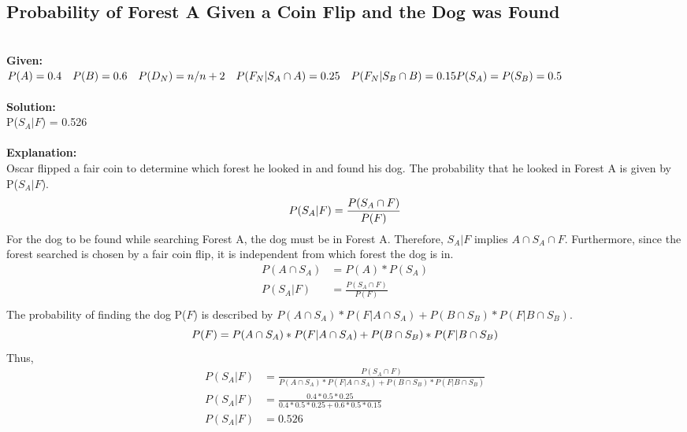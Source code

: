 \subsection{Probability of Forest A Given a Coin Flip and the Dog was Found}
 \\
{\bf Given:}\\    
    $ P(A) = 0.4 \quad P(B) = 0.6 \quad P(D_N) = n/n+2 \quad P(F_{N}|S_A \cap A) = 0.25 \quad P(F_{N}|S_B \cap B) = 0.15 \\ P(S_A)=P(S_B)=0.5$\\ \\
{\bf Solution:}\\
    {\color{blue}P($S_A|F$) = 0.526}\\ \\
{\bf Explanation:}\\
    Oscar flipped a fair coin to determine which forest he looked in and found his dog. The probability that he looked in Forest A is given by P($S_A|F$). \\
    \begin{equation*}
        P(S_A|F) = \frac{P(S_A \cap F)}{P(F)}  \\
    \end{equation*}
    For the dog to be found while searching Forest A, the dog must be in Forest A. Therefore, $S_A|F$ implies $A \cap S_A \cap F$. Furthermore, since the forest searched is chosen by a fair coin flip, it is independent from which forest the dog is in. 
    \begin{align*}
        P(A \cap S_A) &= P(A)*P(S_A) \\
        P(S_A|F) &= \frac{P(S_A \cap F)}{P(F)}  \\
    \end{align*}
    The probability of finding the dog P($F$) is described by $P(A \cap S_A)*P(F|A\cap S_A) + P(B \cap S_B)*P(F|B\cap S_B)$.
    \begin{equation} \label{eq7}
        P(F) = P(A \cap S_A)*P(F|A\cap S_A) + P(B \cap S_B)*P(F|B\cap S_B) \\
    \end{equation}
    Thus, \\
    \begin{align*}
        P(S_A|F) &= \frac{P(S_A \cap F)}{P(A \cap S_A)*P(F|A\cap S_A) + P(B \cap S_B)*P(F|B\cap S_B)} \\
         P(S_A|F) &= \frac{0.4*0.5*0.25}{0.4*0.5*0.25+0.6*0.5*0.15} \\
        P(S_A|F) &= 0.526 \\
    \end{align*}
\pagebreak